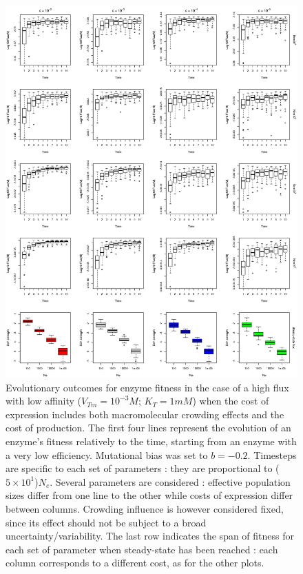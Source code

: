 \begin{figure}[H]
\vspace{-0.5cm}
\begin{center}
\includegraphics[scale=0.5,trim=0cm 0cm 0cm 0cm,clip]{pics/SM-Enzymes/Evo_SteadyState_ConcCostCrow_HighF.jpeg} 
\vspace{-0.1cm}
\caption{\small Evolutionary outcomes for enzyme fitness in the case of a high flux with low affinity ($V_{Tm}=10^{-3}M$; $K_T=1 mM$) when the cost of expression includes both macromolecular crowding effects and the cost of production. The first four lines represent the evolution of an enzyme's fitness relatively to the time, starting from an enzyme with a very low efficiency. Mutational bias was set to $b=-0.2$. Timesteps are specific to each set of parameters : they are proportional to ($5\times 10^1$)$N_e$. Several parameters are considered : effective population sizes differ from one line to the other while costs of expression differ between columns. Crowding influence is however considered fixed, since its effect should not be subject to a broad uncertainty/variability. The last row indicates the span of fitness for each set of parameter when steady-state has been reached : each column corresponds to a different cost, as for the other plots.\normalsize}
\label{fig8d-ann}
\end{center}
\end{figure}

